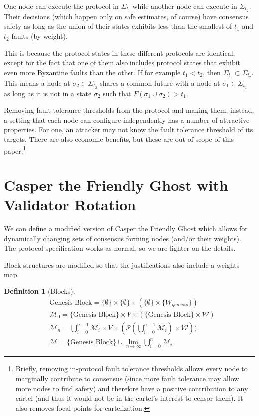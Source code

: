 \documentclass{article}
\theoremstyle{definition}
\newtheorem{defn}{Definition}[section]
\begin{document}
One node can execute the protocol in $\Sigma_{t_1}$ while another node can execute in $\Sigma_{t_2}$. Their decisions (which happen only on safe estimates, of course) have consensus safety as long as the union of their states exhibits less than the smallest of $t_1$ and $t_2$ faults (by weight).

This is because the protocol states in these different protocols are identical, except for the fact that one of them also includes protocol states that exhibit even more Byzantine faults than the other. If for example $t_1 < t_2$, then $\Sigma_{t_1} \subset \Sigma_{t_2}$. This means a node at $\sigma_2 \in \Sigma_{t_2}$ shares a common future with a node at $\sigma_1 \in \Sigma_{t_1}$ as long as it is not in a state $\sigma_2$ such that $F(\sigma_1 \cup \sigma_2) > t_1$.

Removing fault tolerance thresholds from the protocol and making them, instead, a setting that each node can configure independently has a number of attractive properties. For one, an attacker may not know the fault tolerance threshold of its targets. There are also economic benefits, but these are out of scope of this paper.\footnote{Briefly, removing in-protocol fault tolerance thresholds allows every node to marginally contribute to consensus (since more fault tolerance may allow more nodes to find safety) and therefore have a positive contribution to any cartel (and thus it would not be in the cartel's interest to censor them). It also removes focal points for cartelization.}

\section{Casper the Friendly Ghost with Validator Rotation}

We can define a modified version of Casper the Friendly Ghost which allows for dynamically changing sets of consensus forming nodes (and/or their weights). The protocol specification works as normal, so we are lighter on the details.

Block structures are modified so that the justifications also include a weights map.

\begin{defn}[Blocks]
\begin{equation*}
\begin{split}
  &\text{Genesis Block} = \{\emptyset\} \times \{\emptyset\} \times (\{\emptyset\} \times \{W_{genesis}\})\\
    &\mathcal{M}_0 = \{\text{Genesis Block}\} \times V \times (\{\text{Genesis Block}\} \times \mathcal{W})\\
    &\mathcal{M}_n = \bigcup_{i=0}^{n-1} \mathcal{M}_i \times V \times (\mathcal{P}(\bigcup_{i=0}^{n-1} \mathcal{M}_i) \times \mathcal{W}))\\
    &\mathcal{M} = \{\text{Genesis Block}\} \cup \lim_{n \to \infty} \bigcup_{i=0}^{n} \mathcal{M}_i
\end{split}
\end{equation*}
\end{defn}
\end{document}

